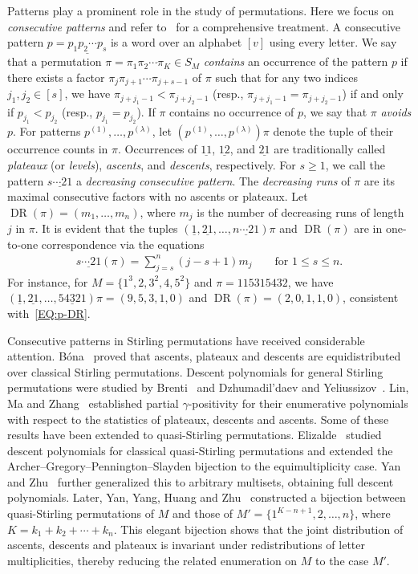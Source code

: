 \documentclass[11pt]{article}
\DeclareMathOperator{\DR}{DR}
\numberwithin{equation}{section}
\begin{document}
Patterns play a prominent role in the study of permutations. Here we focus on \textit{consecutive patterns} and refer to~\cite{Kitaev2011} for a comprehensive treatment. A consecutive pattern $p=\underline{p_1p_2\cdots p_s}$ is a word over an alphabet $[v]$ using every letter. We say that a permutation 
$\pi = \pi_1\pi_2\cdots \pi_K \in S_M$ \emph{contains} an occurrence of the pattern $p$ 
if there exists a factor $\pi_j \pi_{j+1} \cdots \pi_{j+s-1}$ of $\pi$ such 
that for any two indices $j_1, j_2 \in [s]$, we have 
$\pi_{j+j_1-1} < \pi_{j+j_2-1}$ (resp., $\pi_{j+j_1-1} = \pi_{j+j_2-1}$) if and only if $p_{j_1} < p_{j_2}$ (resp., $p_{j_1} = p_{j_2}$). 
If $\pi$ contains no occurrence of $p$, we say that $\pi$ \emph{avoids} $p$. For patterns $p^{(1)},\ldots,p^{(\lambda)}$, let $(p^{(1)},\ldots,p^{(\lambda)})\pi$ denote the tuple of their occurrence counts in $\pi$. Occurrences of $\underline{11}$, $\underline{12}$, and $\underline{21}$ are traditionally called \emph{plateaux} (or \emph{levels}), \emph{ascents}, and \emph{descents}, respectively. For $s\ge1$, we call the pattern $\underline{s\cdots21}$ a \emph{decreasing consecutive pattern}. The \emph{decreasing runs} of $\pi$ are its maximal consecutive factors with no ascents or plateaux. Let $\DR(\pi)=(m_1,\ldots,m_n)$, where $m_j$ is the number of decreasing runs of length $j$ in $\pi$. It is evident that the tuples $(\underline{1},\underline{21},\ldots,\underline{n\cdots21})\pi$ and $\DR(\pi)$ are in one-to-one correspondence via the equations
\begin{align} \label{EQ:p-DR}
\underline{s\cdots21}(\pi)=\sum_{j=s}^{n}(j-s+1)m_j \qquad \text{for }1\le s\le n.
\end{align}
For instance, for $M=\{1^3,2,3^2,4,5^2\}$ and $\pi=115315432$, we have $(\underline{1},\underline{21},\ldots,\underline{54321})\pi=(9,5,3,1,0)$ and $\DR(\pi)=(2,0,1,1,0)$, consistent with~\eqref{EQ:p-DR}.

Consecutive patterns in Stirling permutations have received considerable attention. Bóna~\cite{Bona2008} proved that ascents, plateaux and descents are equidistributed over classical Stirling permutations. Descent polynomials for general Stirling permutations were studied by Brenti~\cite{Brenti1989-2,Brenti1998-3} and Dzhumadil'daev and Yeliussizov~\cite{Dzhumadil2014-5}. Lin, Ma and Zhang~\cite{Lin2021} established partial $\gamma$-positivity for their enumerative polynomials with respect to the statistics of plateaux, descents and ascents. Some of these results have been extended to quasi-Stirling permutations. Elizalde~\cite{Elizalde2021} studied descent polynomials for classical quasi-Stirling permutations and extended the Archer–Gregory–Pennington–Slayden bijection to the equimultiplicity case. Yan and Zhu~\cite{YanZhu2022} further generalized this to arbitrary multisets, obtaining full descent polynomials. Later, Yan, Yang, Huang and Zhu~\cite{YanYangHuangZhu2022} constructed a bijection between quasi-Stirling permutations of $M$ and those of $M'=\{1^{K-n+1},2,\ldots,n\}$, where $K=k_1+k_2+\cdots+k_n$. This elegant bijection shows that the joint distribution of ascents, descents and plateaux is invariant under redistributions of letter multiplicities, thereby reducing the related enumeration on $M$ to the case $M'$.
\end{document}
